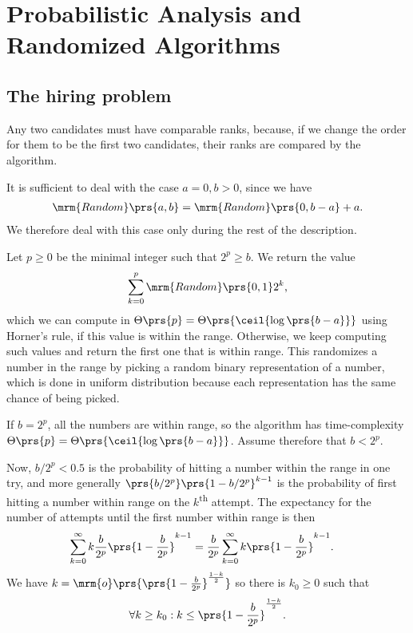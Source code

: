 \documentclass[oneside]{scrbook}
\theoremstyle{definition}
\begin{document}
\chapter{Probabilistic Analysis and Randomized Algorithms}

\section{The hiring problem}

\begin{exercise}
Any two candidates must have comparable ranks, because, if we change the order for them to be the first two candidates, their ranks are compared by the algorithm.
\end{exercise}

\begin{exercise}
It is sufficient to deal with the case $a = 0, b > 0$, since we have
\begin{align*}
\mrm{Random}\prs{a,b} = \mrm{Random}\prs{0,b-a} + a \text{.}
\end{align*}
We therefore deal with this case only during the rest of the description.

Let $p \geq 0$ be the minimal integer such that $2^p \geq b$. We return the value
\begin{align*}
\sum_{k=0}^p \mrm{Random}\prs{0,1} 2^k \text{,}
\end{align*}
which we can compute in $\Theta\prs{p} = \Theta\prs{\ceil{\log\prs{b-a}}}$ using Horner's rule, if this value is within the range. Otherwise, we keep computing such values and return the first one that is within range.
This randomizes a number in the range by picking a random binary representation of a number, which is done in uniform distribution because each representation has the same chance of being picked.

If $b = 2^p$, all the numbers are within range, so the algorithm has time-complexity $\Theta\prs{p} = \Theta\prs{\ceil{\log\prs{b-a}}}$. Assume therefore that $b < 2^p$.

Now, $b/2^p < 0.5$ is the probability of hitting a number within the range in one try, and more generally $\prs{b/2^p} \prs{1 - b/2^p}^{k-1}$ is the probability of first hitting a number within range on the $k$\textsuperscript{th} attempt. The expectancy for the number of attempts until the first number within range is then
\begin{align*}
\sum_{k = 0}^{\infty} k \frac{b}{2^p} \prs{1 - \frac{b}{2^p}}^{k-1} &= \frac{b}{2^p} \sum_{k=0}^{\infty} k \prs{1 - \frac{b}{2^p}}^{k-1} \text{.}
\end{align*}
We have $k = \mrm{o}\prs{\prs{1 - \frac{b}{2^p}}^{\frac{1-k}{2}}}$ so there is $k_0 \geq 0$ such that
\[\forall k \geq k_0 : k \leq \prs{1 - \frac{b}{2^p}}^{\frac{1-k}{2}} \text{.}\]


\end{exercise}
\end{document}
